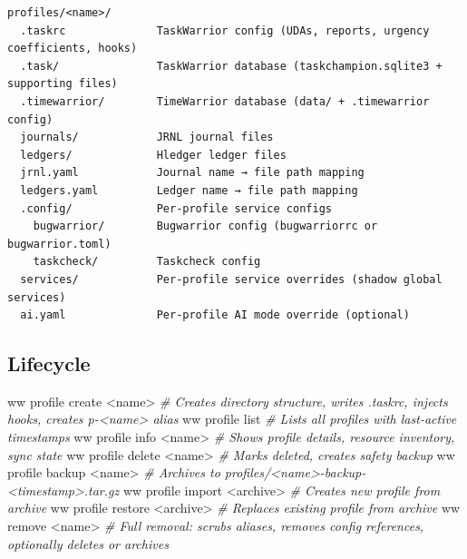 \documentclass[11pt, a4paper, DIV=14]{scrartcl}
\newenvironment{Shaded}{%
  \vspace{4pt}%
  \begin{lrbox}{\ShadedBox}%
  \begin{minipage}{\dimexpr\linewidth-2\fboxsep\relax}%
  \vspace{4pt}%
}{%
  \vspace{4pt}%
  \end{minipage}%
  \end{lrbox}%
  \noindent\colorbox{CodeBg}{\usebox{\ShadedBox}}%
  \par\vspace{4pt}%
}
\newcommand{\CommentTok}[1]{\textcolor{BabbGray}{\textit{#1}}}
\newcommand{\ExtensionTok}[1]{#1}
\newcommand{\NormalTok}[1]{#1}
\newcommand{\OperatorTok}[1]{#1}
\newenvironment{Highlighting}{\ttfamily\fontsize{8.2}{11}\selectfont}{}
\begin{document}
\begin{verbatim}
profiles/<name>/
  .taskrc              TaskWarrior config (UDAs, reports, urgency coefficients, hooks)
  .task/               TaskWarrior database (taskchampion.sqlite3 + supporting files)
  .timewarrior/        TimeWarrior database (data/ + .timewarrior config)
  journals/            JRNL journal files
  ledgers/             Hledger ledger files
  jrnl.yaml            Journal name → file path mapping
  ledgers.yaml         Ledger name → file path mapping
  .config/             Per-profile service configs
    bugwarrior/        Bugwarrior config (bugwarriorrc or bugwarrior.toml)
    taskcheck/         Taskcheck config
  services/            Per-profile service overrides (shadow global services)
  ai.yaml              Per-profile AI mode override (optional)
\end{verbatim}

\subsection{Lifecycle}\label{lifecycle}

\begin{Shaded}
\begin{Highlighting}[]
\ExtensionTok{ww}\NormalTok{ profile create }\OperatorTok{\textless{}}\NormalTok{name}\OperatorTok{\textgreater{}}       \CommentTok{\# Creates directory structure, writes .taskrc, injects hooks, creates p{-}\textless{}name\textgreater{} alias}
\ExtensionTok{ww}\NormalTok{ profile list                }\CommentTok{\# Lists all profiles with last{-}active timestamps}
\ExtensionTok{ww}\NormalTok{ profile info }\OperatorTok{\textless{}}\NormalTok{name}\OperatorTok{\textgreater{}}         \CommentTok{\# Shows profile details, resource inventory, sync state}
\ExtensionTok{ww}\NormalTok{ profile delete }\OperatorTok{\textless{}}\NormalTok{name}\OperatorTok{\textgreater{}}       \CommentTok{\# Marks deleted, creates safety backup}
\ExtensionTok{ww}\NormalTok{ profile backup }\OperatorTok{\textless{}}\NormalTok{name}\OperatorTok{\textgreater{}}       \CommentTok{\# Archives to profiles/\textless{}name\textgreater{}{-}backup{-}\textless{}timestamp\textgreater{}.tar.gz}
\ExtensionTok{ww}\NormalTok{ profile import }\OperatorTok{\textless{}}\NormalTok{archive}\OperatorTok{\textgreater{}}    \CommentTok{\# Creates new profile from archive}
\ExtensionTok{ww}\NormalTok{ profile restore }\OperatorTok{\textless{}}\NormalTok{archive}\OperatorTok{\textgreater{}}   \CommentTok{\# Replaces existing profile from archive}
\ExtensionTok{ww}\NormalTok{ remove }\OperatorTok{\textless{}}\NormalTok{name}\OperatorTok{\textgreater{}}               \CommentTok{\# Full removal: scrubs aliases, removes config references, optionally deletes or archives}
\end{Highlighting}
\end{Shaded}
\end{document}
